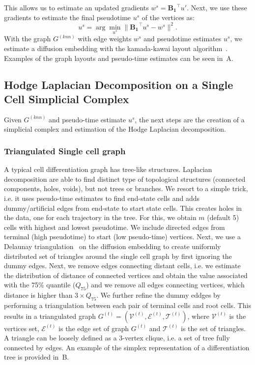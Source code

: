 \noindent This allows us to estimate an updated gradients $w^s=\mathbf{B_1}^\top u'$. Next, we use these gradients to estimate the final pseudotime $u^s$ of the vertices as:
\begin{equation}
\label{eqn:ddhodge3}
    u^s = \arg\underset{u^s}{\min} \| \mathbf{B_1}^\top u^s - w^s\|^2.
\end{equation}
\noindent With the graph $G^{(knn)}$ with edge weights $w^s$ and pseudotime estimates $u^s$, we estimate a diffusion embedding with the kamada-kawai layout algorithm~\citep{gansner2004graph, ortmann2016sparse}. Examples of the graph layouts and pseudo-time estimates can be seen in~A.

\subsection{Hodge Laplacian Decomposition on a Single Cell Simplicial Complex}

Given $G^{(knn)}$ and pseudo-time estimate $u^s$, the next steps are the creation of a simplicial complex and estimation of the Hodge Laplacian decomposition.

\subsubsection{Triangulated Single cell graph}

A typical cell differentiation graph has tree-like structures. Laplacian decomposition are able to find distinct type of topological structures (connected components, holes, voids), but not trees or branches. We resort to a simple trick, i.e. it uses pseudo-time estimates to find end-state cells and adds dummy/artificial edges from end-state to start state cells.  This creates holes in the data, one for each trajectory in the tree. For this, we obtain $m$ (default 5) cells with highest and lowest pseudotime. We include directed edges from terminal (high pseudotime) to start (low pseudo-time) vertices. Next, we use a Delaunay triangulation~\citep{delaunay1934bulletin} on the diffusion embedding to create uniformly distributed set of triangles around the single cell graph by first ignoring the dummy edges. Next, we remove edges connecting distant cells, i.e. we estimate the distribution of distance of connected vertices and obtain the value associated with the 75$\%$ quantile ($Q_{75}$) and we remove all edges connecting vertices, which distance is higher than $3\times Q_{75}$. We further refine the dummy eddges by performing a triangulation between each pair of terminal cells and root cells. This results in a triangulated graph $G^{(t)} = (\mathcal{V}^{(t)},\mathcal{E}^{(t)},\mathcal{T}^{(t)})$, where $\mathcal{V}^{(t)}$ is the vertices set, $\mathcal{E}^{(t)}$ is the edge set of graph $G^{(t)}$ and $\mathcal{T}^{(t)}$ is the set of triangles. A triangle can be loosely defined as a 3-vertex clique, i.e. a set of tree fully connected by edges. An example of the simplex representation of a differentiation tree is provided in~B.


